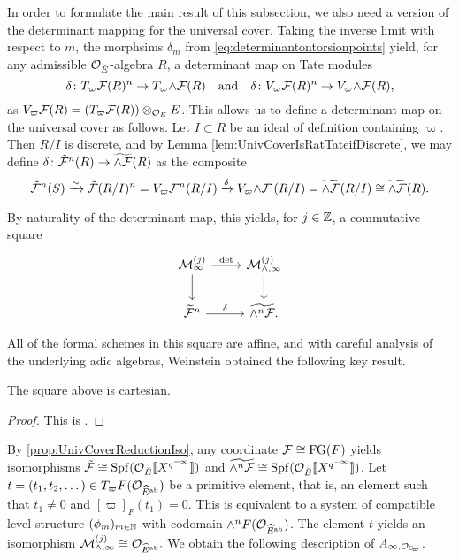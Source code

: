 \documentclass[../main.tex]{subfiles}
\begin{document}
In order to formulate the main result of this subsection, we also need a 
version of the determinant mapping for the universal cover. 
Taking the inverse limit with respect to $m$, the morphsims $\delta_m$ from
\eqref{eq:determinantontorsionpoints} yield, for any 
admissible $\mathcal{O}_{\breve {E}}$-algebra $R$, a determinant map on Tate modules
\begin{equation*}
  \delta \colon T_\varpi \mathcal{F} (R)^n \to T_\varpi {\wedge \mathcal{F}} (R) \quad \text{and} \quad
  \delta \colon V_\varpi \mathcal{F} (R)^n \to V_\varpi {\wedge \mathcal{F}} (R),
\end{equation*}
as $V_\varpi \mathcal{F}(R) = (T_\varpi \mathcal{F}(R))\otimes_{\mathcal{O}_E} E$. This allows us to define a 
determinant map on the universal cover as follows. Let $I \subset R$ be an ideal
of definition containing $\varpi$. Then
$R/I$ is discrete, and by Lemma \ref{lem:UnivCoverIsRatTateifDiscrete}, we may
define $\delta \colon \tilde {\mathcal{F}}^n(R) \to \widetilde {\wedge \mathcal{F}}(R)$
as the composite
\begin{equation*}
  \tilde {\mathcal{F}}^n(S) \xrightarrow{\sim} \tilde {\mathcal{F}}(R/I)^n = V_\varpi \mathcal{F}^n(R/I) 
  \xrightarrow{\delta} V_\varpi {\wedge \mathcal{F}}\, (R/I) = \widetilde {\wedge \mathcal{F}}(R/I) 
  \cong \widetilde {\wedge \mathcal{F}}(R).
\end{equation*}

By naturality of the determinant map, this yields, for
$j \in \mathbb{Z}$, a commutative square 
\begin{equation*}
    \begin{tikzcd}[ampersand replacement=\&]
      {\cM_\infty^{(j)}} \& {\cM_{\wedge, \infty}^{(j)}} \\
    	{\widetilde \cF^n} \& {\widetilde{\wedge^n \cF}.}
    	\arrow["\det", from=1-1, to=1-2]
    	\arrow[from=1-1, to=2-1]
    	\arrow[from=1-2, to=2-2]
    	\arrow["\delta", from=2-1, to=2-2]
    \end{tikzcd}
\end{equation*}

All of the formal schemes in this square are affine, and with careful analysis
of the underlying adic algebras, Weinstein obtained the following key
result.

\begin{thm}\label{thm:WeinsteinsCartesianSquare}
  The square above is cartesian.
  \begin{proof}
  This is \cite[Theorem 2.17]{weinstein2016semistable}.
\end{proof}
\end{thm}

By \cref{prop:UnivCoverReductionIso}, any coordinate $\mathcal{F} \cong \textnormal{FG}(F)$ yields
isomorphisms $\tilde {\mathcal{F}} \cong \operatorname{Spf}(\mathcal{O}_{\breve {E}} \llbracket X^{q^{-\infty}}\rrbracket)$ and
$\widetilde{\wedge^n \mathcal{F}} \cong \operatorname{Spf}(\mathcal{O}_{\breve {E}} \llbracket X^{q^{-\infty}}\rrbracket)$.
Let $t = (t_1, t_2, \dots) \in T_\varpi F(\mathcal{O}_{\widehat E^{\mathrm{ab}}})$ be a primitive element,
that is, an element such that $t_1 \neq 0$ and $[\varpi]_F(t_1) = 0$. 
This is equivalent to a system of compatible level structure $(\phi_m)_{m \in
\mathbb{N}}$ with codomain $\wedge^n F(\mathcal{O}_{\widehat E ^{\mathrm{ab}}})$. 
The element $t$ yields an isomorphism $\mathcal{M}_{\wedge,
\infty}^{(j)} \cong  \mathcal{O}_{\widehat E^{\mathrm{ab}}}.$ We obtain the following description of
$A_{\infty, \cO_\Cp}$. 
\end{document}
